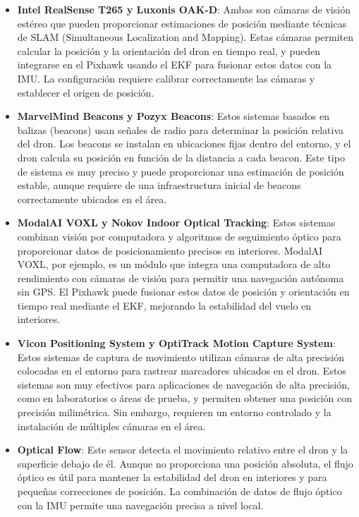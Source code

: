     \begin{itemize}
        \item \textbf{Intel RealSense T265 y Luxonis OAK-D}: Ambas son cámaras de visión estéreo que pueden proporcionar estimaciones de posición mediante técnicas de SLAM (Simultaneous Localization and Mapping). Estas cámaras permiten calcular la posición y la orientación del dron en tiempo real, y pueden integrarse en el Pixhawk usando el EKF para fusionar estos datos con la IMU. La configuración requiere calibrar correctamente las cámaras y establecer el origen de posición.
    
        \item \textbf{MarvelMind Beacons y Pozyx Beacons}: Estos sistemas basados en balizas (beacons) usan señales de radio para determinar la posición relativa del dron. Los beacons se instalan en ubicaciones fijas dentro del entorno, y el dron calcula su posición en función de la distancia a cada beacon. Este tipo de sistema es muy preciso y puede proporcionar una estimación de posición estable, aunque requiere de una infraestructura inicial de beacons correctamente ubicados en el área.
    
        \item \textbf{ModalAI VOXL y Nokov Indoor Optical Tracking}: Estos sistemas combinan visión por computadora y algoritmos de seguimiento óptico para proporcionar datos de posicionamiento precisos en interiores. ModalAI VOXL, por ejemplo, es un módulo que integra una computadora de alto rendimiento con cámaras de visión para permitir una navegación autónoma sin GPS. El Pixhawk puede fusionar estos datos de posición y orientación en tiempo real mediante el EKF, mejorando la estabilidad del vuelo en interiores.
    
        \item \textbf{Vicon Positioning System y OptiTrack Motion Capture System}: Estos sistemas de captura de movimiento utilizan cámaras de alta precisión colocadas en el entorno para rastrear marcadores ubicados en el dron. Estos sistemas son muy efectivos para aplicaciones de navegación de alta precisión, como en laboratorios o áreas de prueba, y permiten obtener una posición con precisión milimétrica. Sin embargo, requieren un entorno controlado y la instalación de múltiples cámaras en el área.
    
        \item \textbf{Optical Flow}: Este sensor detecta el movimiento relativo entre el dron y la superficie debajo de él. Aunque no proporciona una posición absoluta, el flujo óptico es útil para mantener la estabilidad del dron en interiores y para pequeñas correcciones de posición. La combinación de datos de flujo óptico con la IMU permite una navegación precisa a nivel local.
    \end{itemize}
    
